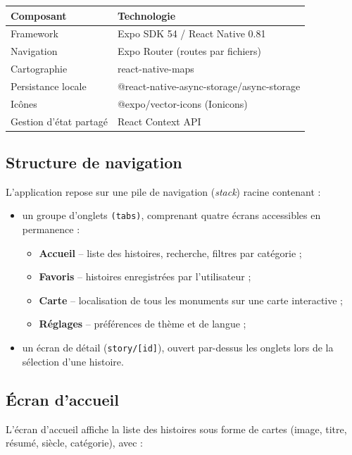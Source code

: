 \documentclass[11pt,a4paper]{article}
\begin{document}
\begin{center}
\begin{tabular}{@{}ll@{}}
\toprule
\textbf{Composant} & \textbf{Technologie} \\
\midrule
Framework & Expo SDK 54 / React Native 0.81 \\
Navigation & Expo Router (routes par fichiers) \\
Cartographie & react-native-maps \\
Persistance locale & @react-native-async-storage/async-storage \\
Icônes & @expo/vector-icons (Ionicons) \\
Gestion d'état partagé & React Context API \\
\bottomrule
\end{tabular}
\end{center}

\subsection{Structure de navigation}

L'application repose sur une pile de navigation (\emph{stack}) racine contenant :

\begin{itemize}[nosep]
    \item un groupe d'onglets \texttt{(tabs)}, comprenant quatre écrans accessibles en permanence :
    \begin{itemize}[nosep]
        \item \textbf{Accueil} -- liste des histoires, recherche, filtres par catégorie ;
        \item \textbf{Favoris} -- histoires enregistrées par l'utilisateur ;
        \item \textbf{Carte} -- localisation de tous les monuments sur une carte interactive ;
        \item \textbf{Réglages} -- préférences de thème et de langue ;
    \end{itemize}
    \item un écran de détail (\texttt{story/[id]}), ouvert par-dessus les onglets lors de la sélection d'une histoire.
\end{itemize}

\subsection{Écran d'accueil}

L'écran d'accueil affiche la liste des histoires sous forme de cartes (image, titre, résumé, siècle, catégorie), avec :
\end{document}
